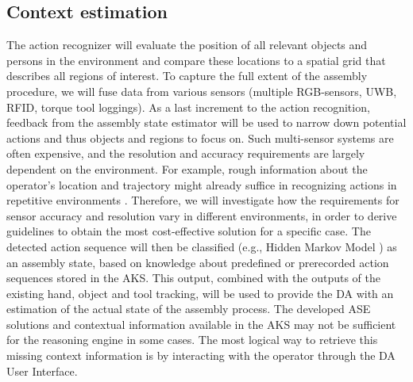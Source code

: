 
\subsection{Context estimation}

The action recognizer will evaluate the position of all relevant objects and persons in the environment and compare these locations to a spatial grid that describes all regions of interest. To capture the full extent of the assembly procedure, we will fuse data from various sensors (multiple RGB-sensors, UWB, RFID, torque tool loggings). As a last increment to the action recognition, feedback from the assembly state estimator will be used to narrow down potential actions and thus objects and regions to focus on. Such multi-sensor systems are often expensive, and the resolution and accuracy requirements are largely dependent on the environment. For example, rough information about the operator's location and trajectory might already suffice in recognizing actions in repetitive environments \cite{bauters2018AutomatedWorkCycle}. Therefore, we will investigate how the requirements for sensor accuracy and resolution vary in different environments, in order to derive guidelines to obtain the most cost-effective solution for a specific case. The detected action sequence will then be classified (e.g., Hidden Markov Model \cite{cramer2018RobustIntentionEstimation}) as an assembly state, based on knowledge about predefined or prerecorded action sequences stored in the AKS. This output, combined with the outputs of the existing hand, object and tool tracking, will be used to provide the DA with an estimation of the actual state of the assembly process. The developed ASE solutions and contextual information available in the AKS may not be sufficient for the reasoning engine in some cases. The most logical way to retrieve this missing context information is by interacting with the operator through the DA User Interface.

